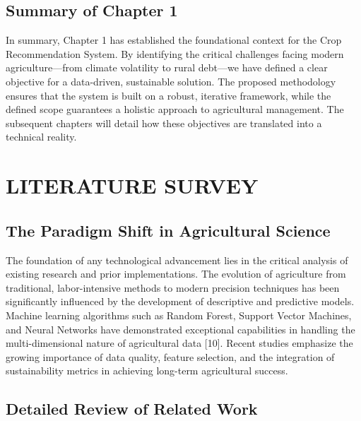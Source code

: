 \documentclass[12pt,a4paper]{report}
\begin{document}
\section{Summary of Chapter 1}
In summary, Chapter 1 has established the foundational context for the Crop Recommendation System. By identifying the critical challenges facing modern agriculture—from climate volatility to rural debt—we have defined a clear objective for a data-driven, sustainable solution. The proposed methodology ensures that the system is built on a robust, iterative framework, while the defined scope guarantees a holistic approach to agricultural management. The subsequent chapters will detail how these objectives are translated into a technical reality.

\chapter{LITERATURE SURVEY}
\label{ch:2}

\section{The Paradigm Shift in Agricultural Science}
\label{sec:2.1}
The foundation of any technological advancement lies in the critical analysis of existing research and prior implementations. The evolution of agriculture from traditional, labor-intensive methods to modern precision techniques has been significantly influenced by the development of descriptive and predictive models. Machine learning algorithms such as Random Forest, Support Vector Machines, and Neural Networks have demonstrated exceptional capabilities in handling the multi-dimensional nature of agricultural data [10]. Recent studies emphasize the growing importance of data quality, feature selection, and the integration of sustainability metrics in achieving long-term agricultural success.

\section{Detailed Review of Related Work}
\end{document}
